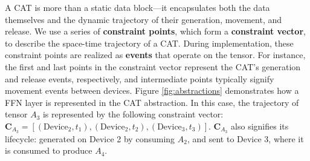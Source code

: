 \documentclass[letterpaper,twocolumn,10pt]{article}
\begin{document}



A CAT is more than a static data block—it encapsulates both the data themselves and the dynamic trajectory of their generation, movement, and release. We use a series of \textbf{constraint points}, which form a \textbf{constraint vector}, to describe the space-time trajectory of a CAT. During implementation, these constraint points are realized as \textbf{events} that operate on the tensor. For instance, the first and last points in the constraint vector represent the CAT's generation and release events, respectively, and intermediate points typically signify movement events between devices. Figure \ref{fig:abstractions} demonstrates how a FFN layer is represented in the CAT abstraction. In this case, the trajectory of tensor $A_3$ is represented by the following constraint vector: $\mathbf{C}_{A_3} = [(\mathrm{Device}_2, t_1), (\mathrm{Device}_2, t_2), (\mathrm{Device}_3, t_3)]$. $\mathbf{C}_{A_3}$ also signifies its lifecycle: generated on Device 2 by consuming $A_2$, and sent to Device 3, where it is consumed to produce $A_4$.
\end{document}

